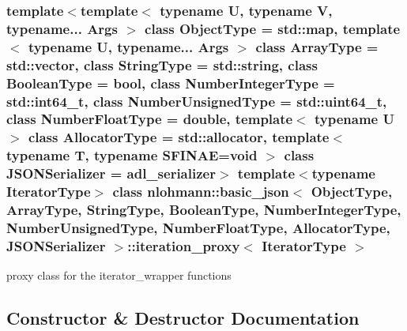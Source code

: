 \subsubsection*{template$<$template$<$ typename U, typename V, typename... Args $>$ class Object\+Type = std\+::map, template$<$ typename U, typename... Args $>$ class Array\+Type = std\+::vector, class String\+Type = std\+::string, class Boolean\+Type = bool, class Number\+Integer\+Type = std\+::int64\+\_\+t, class Number\+Unsigned\+Type = std\+::uint64\+\_\+t, class Number\+Float\+Type = double, template$<$ typename U $>$ class Allocator\+Type = std\+::allocator, template$<$ typename T, typename S\+F\+I\+N\+A\+E=void $>$ class J\+S\+O\+N\+Serializer = adl\+\_\+serializer$>$\newline
template$<$typename Iterator\+Type$>$\newline
class nlohmann\+::basic\+\_\+json$<$ Object\+Type, Array\+Type, String\+Type, Boolean\+Type, Number\+Integer\+Type, Number\+Unsigned\+Type, Number\+Float\+Type, Allocator\+Type, J\+S\+O\+N\+Serializer $>$\+::iteration\+\_\+proxy$<$ Iterator\+Type $>$}

proxy class for the iterator\+\_\+wrapper functions 

\subsection{Constructor \& Destructor Documentation}
\mbox{\label{classnlohmann_1_1basic__json_1_1iteration__proxy_af698dda4c921ee4a56ce9235310ca29c}} 
